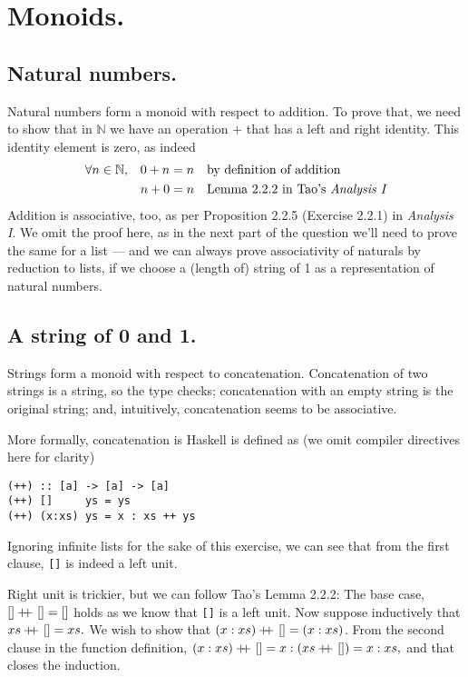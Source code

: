 \section{ Monoids. }

\subsection{Natural numbers.} Natural numbers form a monoid with respect to addition.
To prove that, we need to show that in $\mathbb{N}$ we have an operation $+$ that has a left and right identity.
This identity element is zero, as indeed
\begin{align*}
\forall n \in \mathbb{N},&& 0 + n &= n && \text{by definition of addition} \\
                         && n + 0 &= n && \text{Lemma 2.2.2 in Tao's {\em Analysis I}}
\end{align*}
Addition is associative, too, as per Proposition 2.2.5 (Exercise 2.2.1) in {\em Analysis I}\cite{tao2016}.
We omit the proof here, as in the next part of the question we'll need to prove the same for a list --- and we can always 
prove associativity of naturals by reduction to lists, if we choose a (length of) string of 1 as a representation of natural numbers.

\subsection{A string of 0 and 1.}
Strings form a monoid with respect to concatenation. Concatenation of two strings is a string, so the type checks;
concatenation with an empty string is the original string; and, intuitively, concatenation seems to be associative. 

\newcommand\cat{+\kern-1.3ex+\kern0.8ex} %
More formally, concatenation is Haskell is defined\cite{base-src} as (we omit compiler directives here for clarity)
\begin{verbatim}
(++) :: [a] -> [a] -> [a]
(++) []     ys = ys
(++) (x:xs) ys = x : xs ++ ys
\end{verbatim}
Ignoring infinite lists for the sake of this exercise, we can see that from the first clause, \texttt{[]} is indeed a left unit. 

Right unit is trickier, but we can follow Tao's Lemma 2.2.2: The base case, $[] \cat [] = []$ holds as we know that \texttt{[]} 
is a left unit. Now suppose inductively that $xs \cat [] = xs.$ We wish to show that $(x:xs) \cat [] = (x:xs)$. 
From the second clause in the function definition, $(x:xs) \cat [] = x : (xs \cat []) = x : xs,$ and that closes the induction.

